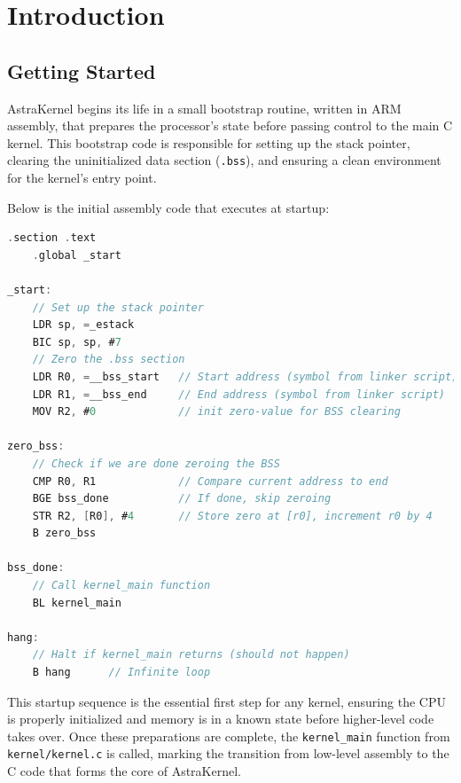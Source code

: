\newpage
\chapter{Introduction}
\section{Getting Started}

AstraKernel begins its life in a small bootstrap routine, written in ARM assembly, 
that prepares the processor’s state before passing control to the main C kernel. 
This bootstrap code is responsible for setting up the stack pointer, clearing 
the uninitialized data section (\texttt{.bss}), and ensuring a clean environment 
for the kernel’s entry point.

Below is the initial assembly code that executes at startup: \\

\begin{lstlisting}[language={C}, caption={Initial bootstrap code for AstraKernel.}, label={lst:bootstrap}]
    .section .text
    .global _start

_start:
    // Set up the stack pointer
    LDR sp, =_estack
    BIC sp, sp, #7
    // Zero the .bss section
    LDR R0, =__bss_start   // Start address (symbol from linker script)
    LDR R1, =__bss_end     // End address (symbol from linker script)
    MOV R2, #0             // init zero-value for BSS clearing

zero_bss:
    // Check if we are done zeroing the BSS
    CMP R0, R1             // Compare current address to end
    BGE bss_done           // If done, skip zeroing
    STR R2, [R0], #4       // Store zero at [r0], increment r0 by 4
    B zero_bss

bss_done:
    // Call kernel_main function
    BL kernel_main

hang:
    // Halt if kernel_main returns (should not happen)
    B hang		// Infinite loop
\end{lstlisting}

This startup sequence is the essential first step for any kernel, ensuring the 
CPU is properly initialized and memory is in a known state before higher-level 
code takes over. Once these preparations are complete, the \texttt{kernel\_main} 
function from \texttt{kernel/kernel.c} is called, marking the transition from 
low-level assembly to the C code that forms the core of AstraKernel.

